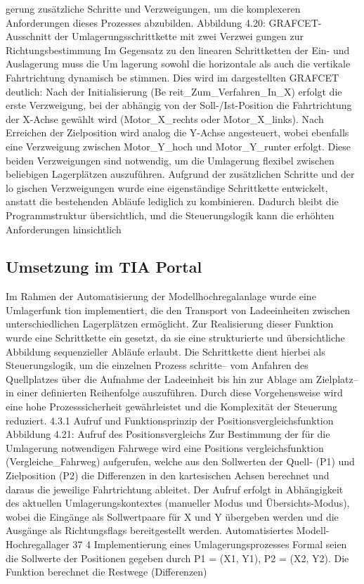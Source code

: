 gerung zusätzliche Schritte und Verzweigungen, um die komplexeren Anforderungen
dieses Prozesses abzubilden.
Abbildung 4.20: GRAFCET-Ausschnitt der Umlagerungsschrittkette mit zwei Verzwei
gungen zur Richtungsbestimmung
Im Gegensatz zu den linearen Schrittketten der Ein- und Auslagerung muss die Um
lagerung sowohl die horizontale als auch die vertikale Fahrtrichtung dynamisch be
stimmen. Dies wird im dargestellten GRAFCET deutlich: Nach der Initialisierung (Be
reit\_Zum\_Verfahren\_In\_X) erfolgt die erste Verzweigung, bei der abhängig von der
Soll-/Ist-Position die Fahrtrichtung der X-Achse gewählt wird (Motor\_X\_rechts oder
Motor\_X\_links). Nach Erreichen der Zielposition wird analog die Y-Achse angesteuert,
wobei ebenfalls eine Verzweigung zwischen Motor\_Y\_hoch und Motor\_Y\_runter erfolgt.
Diese beiden Verzweigungen sind notwendig, um die Umlagerung flexibel zwischen
beliebigen Lagerplätzen auszuführen. Aufgrund der zusätzlichen Schritte und der lo
gischen Verzweigungen wurde eine eigenständige Schrittkette entwickelt, anstatt die
bestehenden Abläufe lediglich zu kombinieren. Dadurch bleibt die Programmstruktur
übersichtlich, und die Steuerungslogik kann die erhöhten Anforderungen hinsichtlich

\subsection{Umsetzung im TIA Portal}
Im Rahmen der Automatisierung der Modellhochregalanlage wurde eine Umlagerfunk
tion implementiert, die den Transport von Ladeeinheiten zwischen unterschiedlichen
Lagerplätzen ermöglicht. Zur Realisierung dieser Funktion wurde eine Schrittkette ein
gesetzt, da sie eine strukturierte und übersichtliche Abbildung sequenzieller Abläufe
erlaubt. Die Schrittkette dient hierbei als Steuerungslogik, um die einzelnen Prozess
schritte– vom Anfahren des Quellplatzes über die Aufnahme der Ladeeinheit bis hin
zur Ablage am Zielplatz– in einer definierten Reihenfolge auszuführen. Durch diese
Vorgehensweise wird eine hohe Prozesssicherheit gewährleistet und die Komplexität
der Steuerung reduziert.
4.3.1 Aufruf und Funktionsprinzip der Positionsvergleichsfunktion
Abbildung 4.21: Aufruf des Positionsvergleichs
Zur Bestimmung der für die Umlagerung notwendigen Fahrwege wird eine Positions
vergleichsfunktion (Vergleiche\_Fahrweg) aufgerufen, welche aus den Sollwerten der
Quell- (P1) und Zielposition (P2) die Differenzen in den kartesischen Achsen berechnet
und daraus die jeweilige Fahrtrichtung ableitet. Der Aufruf erfolgt in Abhängigkeit des
aktuellen Umlagerungskontextes (manueller Modus und Übersichts-Modus), wobei die
Eingänge als Sollwertpaare für X und Y übergeben werden und die Ausgänge als
Richtungsflags bereitgestellt werden.
Automatisiertes Modell- Hochregallager
37
4 Implementierung eines Umlagerungsprozesses
Formal seien die Sollwerte der Positionen gegeben durch
P1 = (X1, Y1),
P2 = (X2, Y2).
Die Funktion berechnet die Restwege (Differenzen)

